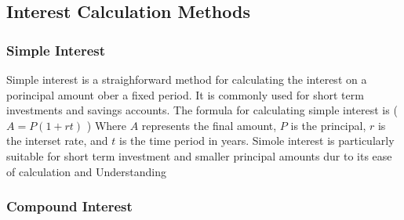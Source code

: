 \documentclass{article}
\theoremstyle{mytheoremstyle}
\theoremstyle{mytheoremstyle}
\theoremstyle{myproblemstyle}
\begin{document}
\subsection{Interest Calculation Methods}
\subsubsection{Simple Interest}
Simple interest is a straighforward method for calculating the interest on a porincipal
amount ober a fixed period. It is commonly used for short term investments 
and savings accounts. The formula for calculating simple interest is 
(\(A=P(1+rt)\) ) Where \(A\) represents the final amount, \(P\) is the principal, \(r\)
is the interset rate, and \(t\) is the time period in years. Simole interest is particularly 
suitable for short term investment and smaller principal amounts dur to its ease of calculation and Understanding

\subsubsection{Compound Interest}
\end{document}
